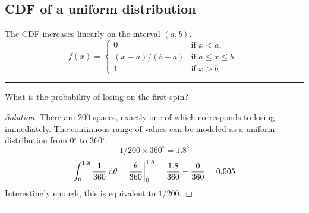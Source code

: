 \documentclass[12pt,letterpaper]{article}
\begin{document}
\subsection{CDF of a uniform distribution}
The CDF increases linearly on the interval $(a,b)$.
\begin{equation*}
f(x)=
\begin{cases}
0 & \text{if } x < a,\\
(x-a)/(b-a) & \text{if } a \leq x \leq b,\\
1 & \text{if } x > b.
\end{cases}
\end{equation*}
\hrule
\begin{problem}
What is the probability of losing on the first spin?
\begin{proof}[Solution]
There are 200 spaces,
exactly one of which corresponds to losing immediately.
The continuous range of values can be modeled as
a uniform distribution from 0$^\circ$ to 360$^\circ$.
\begin{equation*}
1/200 \times 360^\circ = 1.8^\circ
\end{equation*}
\begin{equation}
\int_0^{1.8} \frac{1}{360} \:\mathrm{d}\theta
= \frac{\theta}{360} \bigg|_0^{1.8} 
= \frac{1.8}{360} - \frac{0}{360} = 0.005
\end{equation}
Interestingly enough, this is equivalent to $1/200$.
\end{proof}
\end{problem}
\hrule
\end{document}
